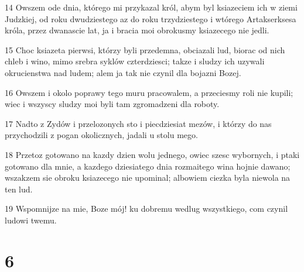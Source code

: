 \par 14 Owszem ode dnia, którego mi przykazal król, abym byl ksiazeciem ich w ziemi Judzkiej, od roku dwudziestego az do roku trzydziestego i wtórego Artakserksesa króla, przez dwanascie lat, ja i bracia moi obrokusmy ksiazecego nie jedli.
\par 15 Choc ksiazeta pierwsi, którzy byli przedemna, obciazali lud, biorac od nich chleb i wino, mimo srebra syklów czterdziesci; takze i sludzy ich uzywali okrucienstwa nad ludem; alem ja tak nie czynil dla bojazni Bozej.
\par 16 Owszem i okolo poprawy tego muru pracowalem, a przeciesmy roli nie kupili; wiec i wszyscy sludzy moi byli tam zgromadzeni dla roboty.
\par 17 Nadto z Zydów i przelozonych sto i piecdziesiat mezów, i którzy do nas przychodzili z pogan okolicznych, jadali u stolu mego.
\par 18 Przetoz gotowano na kazdy dzien wolu jednego, owiec szesc wybornych, i ptaki gotowano dla mnie, a kazdego dziesiatego dnia rozmaitego wina hojnie dawano; wszakzem sie obroku ksiazecego nie upominal; albowiem ciezka byla niewola na ten lud.
\par 19 Wspomnijze na mie, Boze mój! ku dobremu wedlug wszystkiego, com czynil ludowi twemu.

\chapter{6}

